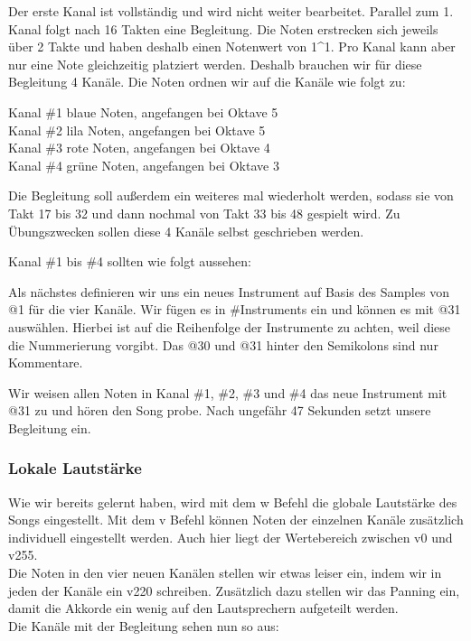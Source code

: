 Der erste Kanal ist vollständig und wird nicht weiter bearbeitet. Parallel zum 1. Kanal folgt nach 16 Takten eine Begleitung. Die Noten erstrecken sich jeweils über 2 Takte und haben deshalb einen Notenwert
von 1\textasciicircum1. Pro Kanal kann aber nur eine Note gleichzeitig platziert werden. Deshalb brauchen wir für diese Begleitung 4 Kanäle. Die Noten ordnen wir auf die Kanäle wie folgt zu:

\bigskip

Kanal \#1 blaue Noten, angefangen bei Oktave 5 \\
Kanal \#2 lila Noten, angefangen bei Oktave 5 \\
Kanal \#3 rote Noten, angefangen bei Oktave 4 \\
Kanal \#4 grüne Noten, angefangen bei Oktave 3

\bigskip

Die Begleitung soll außerdem ein weiteres mal wiederholt werden, sodass sie von Takt 17 bis 32 und dann nochmal von Takt 33 bis 48 gespielt wird. Zu Übungszwecken sollen diese 4 Kanäle selbst geschrieben werden.

\bigskip

Kanal \#1 bis \#4 sollten wie folgt aussehen: 

\medskip



\medskip

Als nächstes definieren wir uns ein neues Instrument auf Basis des Samples von @1 für die vier Kanäle.
Wir fügen es in \#Instruments ein und können es mit @31 auswählen.
Hierbei ist auf die Reihenfolge der Instrumente zu achten, weil diese die Nummerierung vorgibt. Das @30 und @31 hinter den Semikolons sind nur Kommentare.

\medskip



\medskip

Wir weisen allen Noten in Kanal \#1, \#2, \#3 und \#4 das neue Instrument mit @31 zu und hören den Song probe. Nach ungefähr 47 Sekunden setzt unsere Begleitung ein.

\subsubsection{Lokale Lautstärke}
Wie wir bereits gelernt haben, wird mit dem w Befehl die globale Lautstärke des Songs eingestellt. Mit dem v Befehl können Noten der einzelnen Kanäle zusätzlich individuell eingestellt werden. Auch hier liegt der Wertebereich zwischen v0 und v255. \\
Die Noten in den vier neuen Kanälen stellen wir etwas leiser ein, indem wir in jeden der Kanäle ein v220 schreiben. Zusätzlich dazu stellen wir das Panning ein, damit die Akkorde ein wenig auf den Lautsprechern aufgeteilt werden. \\
Die Kanäle mit der Begleitung sehen nun so aus: \\

